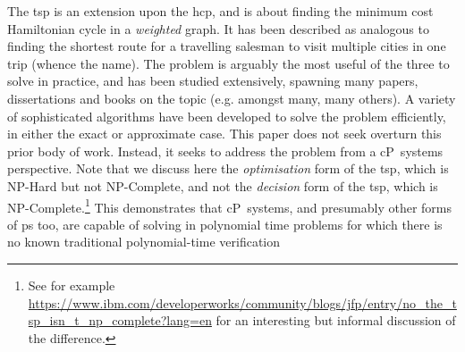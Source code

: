 
The \gls{tsp} is an extension upon the \gls{hcp}, and is about finding the minimum cost Hamiltonian cycle in a \textit{weighted} graph.  It has been described as analogous to finding the shortest route for a travelling salesman to visit multiple cities in one trip (whence the name).  The problem is arguably the most useful of the three to solve in practice, and has been studied extensively, spawning many papers, dissertations and books on the topic (e.g. \cite{Smith2017,Ezugwu2017,Cook2012,Applegate2006} amongst many, many others).  A variety of sophisticated algorithms have been developed to solve the problem efficiently, in either the exact or approximate case.  This paper does not seek overturn this prior body of work.  Instead, it seeks to address the problem from a cP~systems perspective.  Note that we discuss here the \textit{optimisation} form of the \gls{tsp}, which is NP-Hard but not NP-Complete, and not the \textit{decision} form of the \gls{tsp}, which is NP-Complete.\footnote{See for example \url{https://www.ibm.com/developerworks/community/blogs/jfp/entry/no_the_tsp_isn_t_np_complete?lang=en} for an interesting but informal discussion of the difference.}  This demonstrates that cP~systems, and presumably other forms of \gls{ps} too, are capable of solving in polynomial time problems for which there is no known traditional polynomial-time verification%

